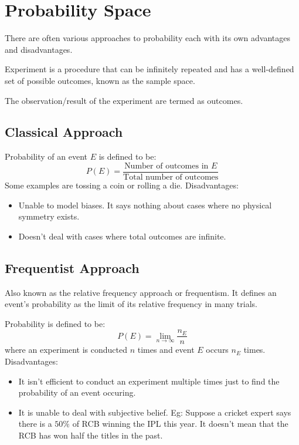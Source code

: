 \documentclass{article}
\begin{document}
\newtheorem{theorem}{Theorem}[section]
\newtheorem{corollary}{Corollary}[theorem]
\newtheorem{lemma}[theorem]{Lemma}

\tableofcontents
\newpage

\section{Probability Space}
There are often various approaches to probability each with its own advantages
and disadvantages.

Experiment is a procedure that can be infinitely repeated and has a
well-defined set of possible outcomes, known as the sample space.

The observation/result of the experiment are termed as outcomes.

\subsection{Classical Approach}
        Probability of an event $E$ is defined to be: $$P(E)=\frac{\text{Number of outcomes in }E}{\text{Total number of outcomes}}$$
         Some examples are tossing a coin or rolling a die.
         Disadvantages:
         \begin{itemize}
             \item Unable to model biases. It says nothing about cases where no
             physical symmetry exists.
             \item Doesn't deal with cases where total outcomes are infinite.
         \end{itemize}

         \subsection{Frequentist Approach}
         Also known as the relative frequency approach or frequentism. It defines
         an event's probability as the limit of its relative frequency in many
         trials.

         Probability is defined to be:
         $$ P(E)=\lim_{n \to \infty} \frac{n_E}{n}$$
         where an experiment is conducted $n$ times and event $E$ occurs $n_E$
         times.
         Disadvantages:
         \begin{itemize}
             \item It isn't efficient to conduct an experiment multiple times
             just to find the probability of an event occuring.
             \item It is unable to deal with subjective belief. Eg: Suppose a
             cricket expert says there is a $50\%$ of RCB winning the IPL this
             year. It doesn't mean that the RCB has won half the titles in the
             past.
         \end{itemize}
%
\end{document}
